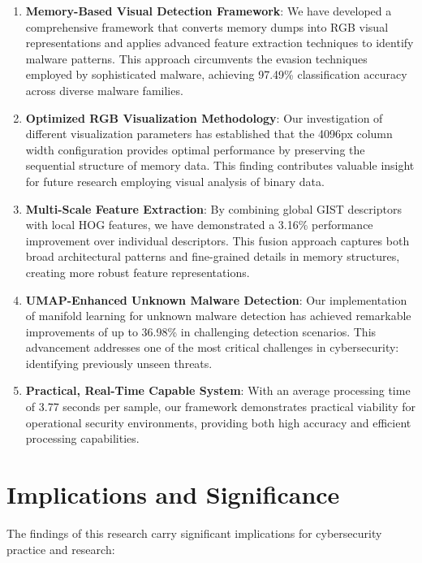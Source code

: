 \begin{enumerate}
    \item \textbf{Memory-Based Visual Detection Framework}: We have developed a comprehensive framework that converts memory dumps into RGB visual representations and applies advanced feature extraction techniques to identify malware patterns. This approach circumvents the evasion techniques employed by sophisticated malware, achieving 97.49\% classification accuracy across diverse malware families.
    
    \item \textbf{Optimized RGB Visualization Methodology}: Our investigation of different visualization parameters has established that the 4096px column width configuration provides optimal performance by preserving the sequential structure of memory data. This finding contributes valuable insight for future research employing visual analysis of binary data.
    
    \item \textbf{Multi-Scale Feature Extraction}: By combining global GIST descriptors with local HOG features, we have demonstrated a 3.16\% performance improvement over individual descriptors. This fusion approach captures both broad architectural patterns and fine-grained details in memory structures, creating more robust feature representations.
    
    \item \textbf{UMAP-Enhanced Unknown Malware Detection}: Our implementation of manifold learning for unknown malware detection has achieved remarkable improvements of up to 36.98\% in challenging detection scenarios. This advancement addresses one of the most critical challenges in cybersecurity: identifying previously unseen threats.
    
    \item \textbf{Practical, Real-Time Capable System}: With an average processing time of 3.77 seconds per sample, our framework demonstrates practical viability for operational security environments, providing both high accuracy and efficient processing capabilities.
\end{enumerate}

\section{Implications and Significance}

The findings of this research carry significant implications for cybersecurity practice and research:

